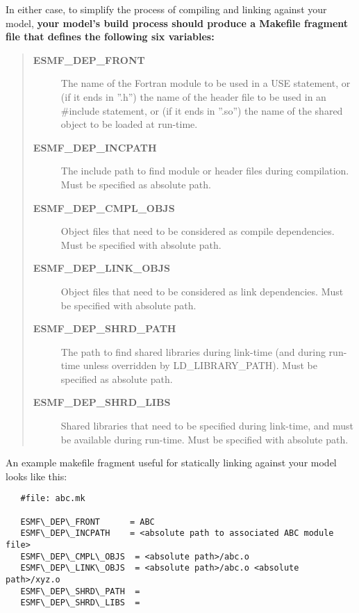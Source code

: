 In either case, to simplify the process of compiling and linking against
your model, \textbf{your model's build process should produce a Makefile fragment file
that defines the following six variables:}
\begin{quote}
\begin{description}
\item[{\textbf{ESMF\_DEP\_FRONT}}] \leavevmode
The name of the Fortran module to be used in a USE statement,
or (if it ends in ''.h'') the name of the header file to be used
in an \#include statement, or (if it ends in ''.so'') the name of
the shared object to be loaded at run-time.

\item[{\textbf{ESMF\_DEP\_INCPATH}}] \leavevmode
The include path to find module or header files during compilation. Must be specified as absolute path.

\item[{\textbf{ESMF\_DEP\_CMPL\_OBJS}}] \leavevmode
Object files that need to be considered as compile dependencies. Must be specified with absolute path.

\item[{\textbf{ESMF\_DEP\_LINK\_OBJS}}] \leavevmode
Object files that need to be considered as link dependencies. Must be specified with absolute path.

\item[{\textbf{ESMF\_DEP\_SHRD\_PATH}}] \leavevmode
The path to find shared libraries during link-time (and during run-time unless overridden by LD\_LIBRARY\_PATH). Must be specified as absolute path.

\item[{\textbf{ESMF\_DEP\_SHRD\_LIBS}}] \leavevmode
Shared libraries that need to be specified during link-time, and must be available during run-time. Must be specified with absolute path.

\end{description}
\end{quote}

An example makefile fragment useful for statically linking against your model looks like this:

\begin{verbatim}
   #file: abc.mk
 
   ESMF\_DEP\_FRONT      = ABC
   ESMF\_DEP\_INCPATH    = <absolute path to associated ABC module file>
   ESMF\_DEP\_CMPL\_OBJS  = <absolute path>/abc.o
   ESMF\_DEP\_LINK\_OBJS  = <absolute path>/abc.o <absolute path>/xyz.o
   ESMF\_DEP\_SHRD\_PATH  = 
   ESMF\_DEP\_SHRD\_LIBS  =
\end{verbatim}

